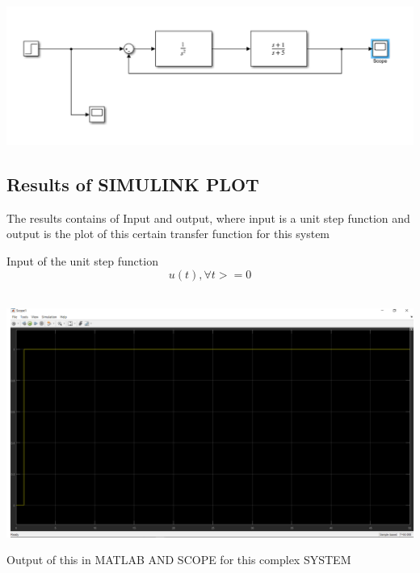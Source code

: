 \documentclass[12pt]{article}
\begin{document}
\includegraphics[scale=0.5]{../Lab3,4/HW for lab 3,4/LAB3/Block_diagram.png} 
\\
\cleardoublepage
\subsection{Results of SIMULINK PLOT} 
The results contains of Input and output, where input is a unit step function and output is the plot of this certain transfer function for this system\\

\begin{center}
Input of the unit step function$$u(t),\forall t>=0$$\\
\end{center}
\includegraphics[scale=0.4]{../Lab3,4/HW for lab 3,4/LAB3/Input.png}\\

\cleardoublepage 

\begin{center}
Output of this in MATLAB AND SCOPE for this complex SYSTEM\\
\end{center}
 
\end{document}
